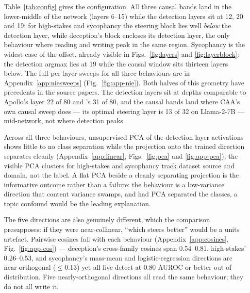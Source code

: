 \documentclass[conference]{IEEEtran}
\begin{document}
Table~\ref{tab:config} gives the configuration. All three causal bands land in
the lower-middle of the network (layers 6--15) while the detection layers sit at
12, 20 and 19: for high-stakes and sycophancy the steering block lies well
\emph{below} the detection layer, while deception's block encloses its detection
layer, the only behaviour where reading and writing peak in the same region.
Sycophancy is the widest case of the offset, already visible in
Figs.~\ref{fig:layers} and \ref{fig:layerblock}: the detection argmax lies at
19 while the causal window sits thirteen layers below. The full per-layer sweeps for all three behaviours
are in Appendix~\ref{app:niesweeps} (Fig.~\ref{fig:app-nie}). Both
halves of this geometry have precedents in the source papers. The detection
layers sit at depths comparable to Apollo's layer 22 of 80 and
\citeauthor{mckenzie2025}'s 31 of 80, and the causal bands land where CAA's own
causal sweep does --- its optimal steering layer is 13 of 32 on Llama-2-7B
\citep{rimsky2024} --- mid-network, not where detection peaks.

Across all three behaviours, unsupervised PCA of the detection-layer activations
shows little to no class separation while the projection onto the trained
direction separates cleanly (Appendix~\ref{app:linear}, Figs.~\ref{fig:pca}
and \ref{fig:app-pca}); the
visible PCA clusters for high-stakes
and sycophancy track dataset source and domain, not the label. A flat PCA
beside a cleanly separating projection is the informative outcome rather than a
failure: the behaviour is a low-variance direction that content variance
swamps, and had PCA separated the classes, a topic confound would be the
leading explanation.

The five directions are also genuinely different, which the comparison
presupposes: if they were near-collinear, ``which steers better'' would be a
units artefact. Pairwise cosines fall with each behaviour
(Appendix~\ref{app:cosines}, Fig.~\ref{fig:app-cos}) --- deception's
cross-family cosines span 0.54--0.81, high-stakes' 0.26--0.53, and sycophancy's
mass-mean and logistic-regression directions are near-orthogonal ($\leq 0.13$)
yet all five detect at 0.80 AUROC or better out-of-distribution. Five
nearly-orthogonal directions all read the same behaviour; they do not all write
it.
\end{document}
